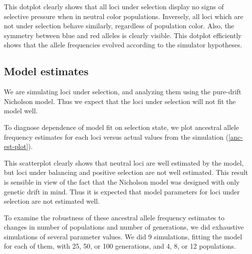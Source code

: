 \documentclass[a4paper,12pt]{article}
\begin{document}

This dotplot clearly shows that all loci under selection display no
signs of selective pressure when in neutral color
populations. Inversely, all loci which are not under selection behave
similarly, regardless of population color. Also, the symmetry between
blue and red alleles is clearly visible. This dotplot efficiently
shows that the allele frequencies evolved according to the simulator
hypotheses.

\subsection{Model estimates}

We are simulating loci under selection, and analyzing them using the
pure-drift Nicholson model. Thus we expect that the loci under
selection will not fit the model well.

To diagnose dependence of model fit on selection state, we plot
ancestral allele frequency estimates for each loci versus actual
values from the simulation (\autoref{anc-est-plot}).


This scatterplot clearly shows that neutral loci are well estimated by
the model, but loci under balancing and positive selection are not
well estimated. This result is sensible in view of the fact that the
Nicholson model was designed with only genetic drift in mind. Thus it
is expected that model parameters for loci under selection are not
estimated well.

To examine the robustness of these ancestral allele frequency
estimates to changes in number of populations and number of
generations, we did exhaustive simulations of several parameter
values. We did 9 simulations, fitting the model for each of them, with
25, 50, or 100 generations, and 4, 8, or 12 populations.
\end{document}
